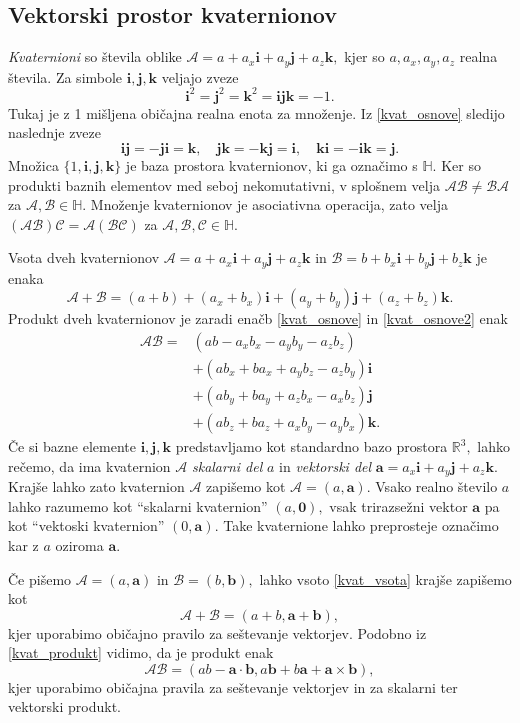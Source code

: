 \documentclass[12pt,a4paper,twoside]{article}
\theoremstyle{definition} %
\theoremstyle{plain} %
\theoremstyle{primerstyle}
\numberwithin{equation}{section}  %
\newcommand{\R}{\mathbb R}
\newcommand{\quat}{\mathbb H}
\newcommand{\aV}{\mathbf{a}}
\newcommand{\bV}{\mathbf{b}}
\newcommand{\iV}{\mathbf{i}}
\newcommand{\jV}{\mathbf{j}}
\newcommand{\kV}{\mathbf{k}}
\newcommand{\AQ}{\mathcal{A}}
\newcommand{\BQ}{\mathcal{B}}
\newcommand{\CQ}{\mathcal{C}}
\begin{document}
\subsection{Vektorski prostor kvaternionov}
\label{kvaternioni_poglavje}

\emph{Kvaternioni} so števila oblike $\AQ=a+a_x\iV+a_y\jV+a_z\kV,$ kjer so $a,a_x,a_y,a_z$ realna števila. Za simbole $\iV,\jV,\kV$ veljajo zveze
\begin{equation}
	\label{kvat_osnove}
	\iV^2=\jV^2=\kV^2=\iV\jV\kV=-1.
\end{equation}
Tukaj je z 1 mišljena običajna realna enota za množenje. Iz \eqref{kvat_osnove} sledijo naslednje zveze
\begin{equation}
	\label{kvat_osnove2}
	\iV\jV=-\jV\iV=\kV,\quad\jV\kV=-\kV\jV=\iV,\quad\kV\iV=-\iV\kV=\jV.
\end{equation}
Množica $\{1,\iV,\jV,\kV\}$ je baza prostora kvaternionov, ki ga označimo s $\quat.$ Ker so produkti baznih elementov med seboj nekomutativni, v splošnem velja $\AQ\BQ\neq\BQ\AQ$ za $\AQ,\BQ\in\quat.$ Množenje kvaternionov je asociativna operacija, zato velja $(\AQ\BQ)\CQ=\AQ(\BQ\CQ)$ za $\AQ,\BQ,\CQ\in\quat.$

Vsota dveh kvaternionov $\AQ=a+a_x\iV+a_y\jV+a_z\kV$ in $\BQ=b+b_x\iV+b_y\jV+b_z\kV$ je enaka
\begin{equation}
	\label{kvat_vsota}
	\AQ+\BQ=(a+b)+(a_x+b_x)\iV+(a_y+b_y)\jV+(a_z+b_z)\kV.
\end{equation}
Produkt dveh kvaternionov je zaradi enačb \eqref{kvat_osnove} in \eqref{kvat_osnove2} enak
\begin{align}
	\AQ\BQ=&(ab-a_xb_x-a_yb_y-a_zb_z)\nonumber\\
	&+(ab_x+ba_x+a_yb_z-a_zb_y)\iV\label{kvat_produkt}\\
	&+(ab_y+ba_y+a_zb_x-a_xb_z)\jV\nonumber\\
	&+(ab_z+ba_z+a_xb_y-a_yb_x)\kV.\nonumber
\end{align}
Če si bazne elemente $\iV,\jV,\kV$ predstavljamo kot standardno bazo prostora $\R^3,$ lahko rečemo, da ima kvaternion $\AQ$ \emph{skalarni del} $a$ in \emph{vektorski del} $\aV=a_x\iV+a_y\jV+a_z\kV.$ Krajše lahko zato kvaternion $\AQ$ zapišemo kot $\AQ=(a,\aV).$ Vsako realno število $a$ lahko razumemo kot ``skalarni kvaternion'' $(a,\mathbf{0}),$ vsak trirazsežni vektor $\aV$ pa kot ``vektoski kvaternion'' $(0,\aV).$ Take kvaternione lahko preprosteje označimo kar z $a$ oziroma $\aV.$

Če pišemo $\AQ=(a,\aV)$ in $\BQ=(b,\bV),$ lahko vsoto \eqref{kvat_vsota} krajše zapišemo kot
\begin{equation}
	\label{kvat_vsota2}
	\AQ+\BQ=(a+b,\aV+\bV),
\end{equation}
kjer uporabimo običajno pravilo za seštevanje vektorjev. Podobno iz \eqref{kvat_produkt} vidimo, da je produkt enak
\begin{equation}
	\label{kvat_produkt2}
	\AQ\BQ=(ab-\aV\cdot\bV,a\bV+b\aV+\aV\times\bV),
\end{equation}
kjer uporabimo običajna pravila za seštevanje vektorjev in za skalarni ter vektorski produkt.
\end{document}
